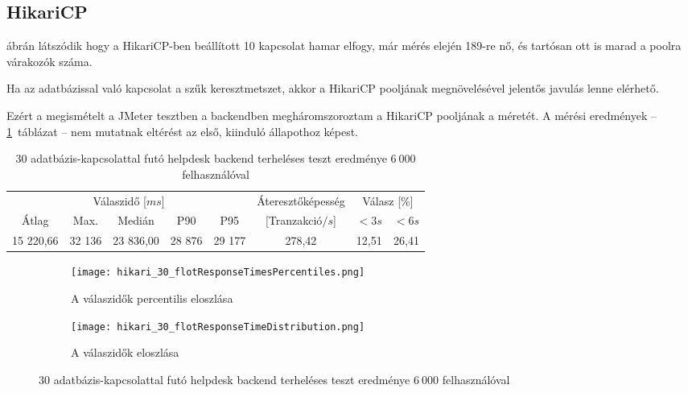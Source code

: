 \subsection{HikariCP}\label{sec:hikari}
 ábrán látszódik hogy a HikariCP-ben beállított 10 kapcsolat hamar elfogy, már mérés elején 189-re nő, és tartósan ott is marad a poolra várakozók száma.

Ha az adatbázissal való kapcsolat a szűk keresztmetszet, akkor a HikariCP pooljának megnövelésével jelentős javulás lenne elérhető.

Ezért a megismételt a JMeter tesztben a backendben megháromszoroztam a HikariCP pooljának a méretét. A mérési eredmények --  \ref{tabl:hikari_30}~táblázat --   nem mutatnak eltérést az első, kiinduló állapothoz képest.

\begin{table}[hbt]
	\begin{tabular}{ccccc|c|cc}
		\multicolumn{5}{c|}{Válaszidő [$ms$]}  & Áteresztőképesség & \multicolumn{2}{c}{Válasz [\%]}	\\
		Átlag & Max. & Medián & P90 & P95 &	[Tranzakció$/s$] & $<3s$& $<6s$ \\
		\hline 
		15 220,66 & 32 136 & 23 836,00 & 28 876 & 29 177 & 278,42 & 12,51 & 26,41 \\
	\end{tabular} 
	\caption{30 adatbázis-kapcsolattal futó helpdesk backend terheléses teszt eredménye $6~000$ felhasználóval}
	\label{tabl:hikari_30}
\end{table}



\begin{figure}[hbt]
	\begin{subfigure}{.49\textwidth}
		\centering
		\texttt{[image: hikari\_30\_flotResponseTimesPercentiles.png]}  
		\caption{A válaszidők percentilis eloszlása}
	\end{subfigure}
	\begin{subfigure}{.49\textwidth}
		\centering
		\texttt{[image: hikari\_30\_flotResponseTimeDistribution.png]}  
		\caption{A válaszidők eloszlása}
	\end{subfigure}
	
	\caption[Helpdesk backend terheléses teszt módosított HikariCp beállításokkal]{30 adatbázis-kapcsolattal futó helpdesk backend terheléses teszt eredménye $6~000$ felhasználóval}
\end{figure}


